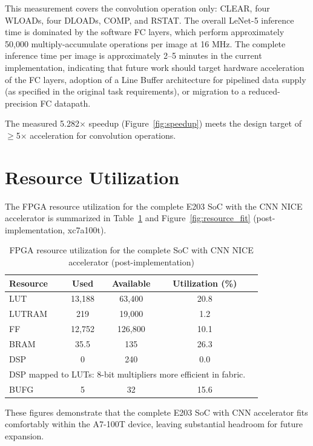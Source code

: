 This measurement covers the convolution operation only: CLEAR, four WLOADs, four DLOADs, COMP, and RSTAT. The overall LeNet-5 inference time is dominated by the software FC layers, which perform approximately 50,000 multiply-accumulate operations per image at 16 MHz. The complete inference time per image is approximately 2--5 minutes in the current implementation, indicating that future work should target hardware acceleration of the FC layers, adoption of a Line Buffer architecture for pipelined data supply (as specified in the original task requirements), or migration to a reduced-precision FC datapath.

The measured 5.282$\times$ speedup (Figure~\ref{fig:speedup}) meets the design target of $\geq$5$\times$ acceleration for convolution operations.

\section{Resource Utilization}\label{sec:4_6}

The FPGA resource utilization for the complete E203 SoC with the CNN NICE accelerator is summarized in Table~\ref{tab:4_6} and Figure~\ref{fig:resource_fit} (post-implementation, \mbox{xc7a100t}).


\begin{table}[htbp]
\centering
\caption[FPGA resource utilization for the complete SoC]{FPGA resource utilization for the complete SoC with CNN NICE accelerator (post-implementation)}
\label{tab:4_6}
\begin{tabular}{lcccc}
\hline
Resource & Used & Available & Utilization (\%) \\ \hline\hline
LUT & 13,188 & 63,400 & 20.8 \\ \hline
LUTRAM & 219 & 19,000 & 1.2 \\ \hline
FF & 12,752 & 126,800 & 10.1 \\ \hline
BRAM & 35.5 & 135 & 26.3 \\ \hline
DSP & 0 & 240 & 0.0\tabularnewline
\multicolumn{4}{l}{\footnotesize DSP mapped to LUTs: 8-bit multipliers more efficient in fabric.} \\ \hline
BUFG & 5 & 32 & 15.6 \\ \hline
\end{tabular}
\end{table}

These figures demonstrate that the complete E203 SoC with CNN accelerator fits comfortably within the A7-100T device, leaving substantial headroom for future expansion.


